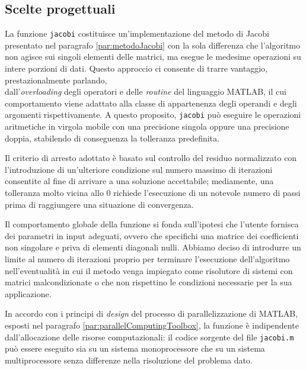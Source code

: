 \subsection{Scelte progettuali}
La funzione \lstinline{jacobi} costituisce un'implementazione del metodo di Jacobi presentato nel paragrafo \ref{par:metodoJacobi} con la sola differenza che l'algoritmo non agisce sui
singoli elementi delle matrici, ma esegue le medesime operazioni su intere porzioni di dati.\newline
Questo approccio ci consente di trarre vantaggio, prestazionalmente parlando, \\ dall'\textit{overloading} degli operatori e delle \textit{routine} del linguaggio MATLAB, il cui comportamento viene adattato
alla classe di appartenenza degli operandi e degli argomenti rispettivamente.\newline
A questo proposito, \lstinline{jacobi} pu\`o eseguire le operazioni aritmetiche in virgola mobile con una precisione singola oppure una precisione
doppia, stabilendo di conseguenza la tolleranza predefinita.

Il criterio di arresto adottato \`e basato sul controllo del residuo normalizzato con l'introduzione di un'ulteriore condizione sul numero massimo di
iterazioni consentite al fine di arrivare a una soluzione accettabile; mediamente, una tolleranza molto vicina allo 0 richiede
l'esecuzione di un notevole numero di passi prima di raggiungere una situazione di convergenza.

Il comportamento globale della funzione si fonda sull'ipotesi che l'utente fornisca dei parametri in input adeguati, ovvero che specifichi una matrice dei
coefficienti non singolare e priva di elementi diagonali nulli.\newline
Abbiamo deciso di introdurre un limite al numero di iterazioni proprio per terminare l'esecuzione dell'algoritmo nell'eventualit\`a in cui il metodo venga
impiegato come risolutore di sistemi con matrici malcondizionate o che non rispettino le condizioni necessarie per la sua applicazione.

In accordo con i principi di \textit{design} del processo di parallelizzazione di MATLAB, esposti nel paragrafo \ref{par:parallelComputingToolbox}, la funzione \`e
indipendente dall'allocazione delle risorse computazionali: il codice sorgente del file \lstinline{jacobi.m} pu\`o essere eseguito sia su un
sistema monoprocessore che su un sistema multiprocessore senza differenze nella risoluzione del problema dato.

